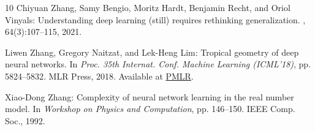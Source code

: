 \begin{thebibliography}{10}
{\sc Chiyuan Zhang, Samy Bengio, Moritz Hardt, Benjamin Recht, and Oriol
  Vinyals}: Understanding deep learning (still) requires rethinking
  generalization.
, 64(3):107--115, 2021.
\newblock [\epfmtdoi{10.1145/3446776}]

{\sc Liwen Zhang, Gregory Naitzat, and Lek-Heng Lim}: Tropical geometry of deep
  neural networks.
\newblock In {\em Proc. 35th Internat. Conf. Machine Learning (ICML'18)}, pp.
  5824--5832. MLR Press, 2018.
\newblock Available at
  \href{https://proceedings.mlr.press/v80/zhang18i.html}{PMLR}.

{\sc Xiao-Dong Zhang}: Complexity of neural network learning in the real number
  model.
\newblock In {\em Workshop on Physics and Computation}, pp. 146--150. IEEE
  Comp. Soc., 1992.

\end{thebibliography}